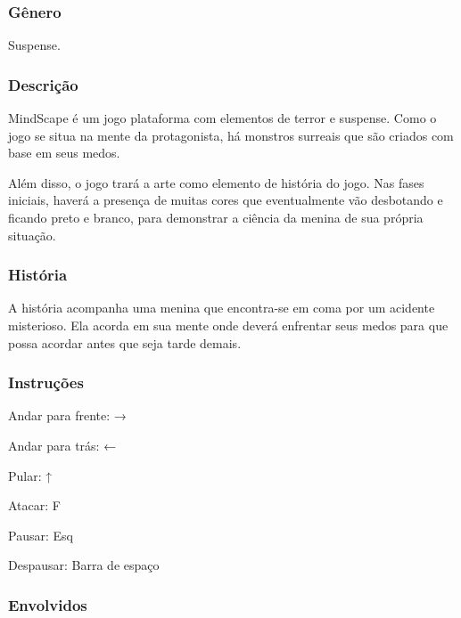 \subsubsection*{Gênero}

Suspense.

\subsubsection*{Descrição}

Mind\+Scape é um jogo plataforma com elementos de terror e suspense. Como o jogo se situa na mente da protagonista, há monstros surreais que são criados com base em seus medos.

Além disso, o jogo trará a arte como elemento de história do jogo. Nas fases iniciais, haverá a presença de muitas cores que eventualmente vão desbotando e ficando preto e branco, para demonstrar a ciência da menina de sua própria situação.

\subsubsection*{História}

A história acompanha uma menina que encontra-\/se em coma por um acidente misterioso. Ela acorda em sua mente onde deverá enfrentar seus medos para que possa acordar antes que seja tarde demais.

\subsubsection*{Instruções}


\begin{DoxyItemize}
\item Andar para frente\+: →
\item Andar para trás\+: ←
\item Pular\+: ↑
\item Atacar\+: F
\item Pausar\+: Esq
\item Despausar\+: Barra de espaço
\end{DoxyItemize}

\subsubsection*{Envolvidos}

